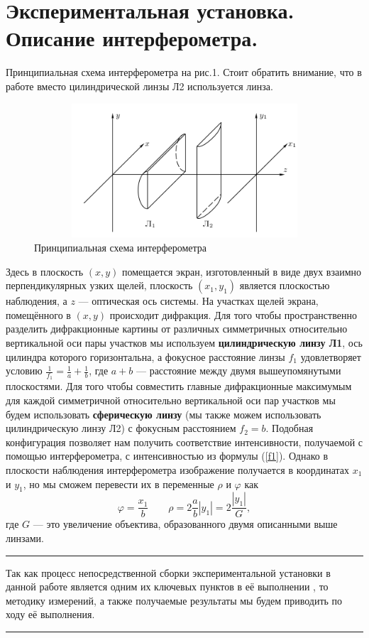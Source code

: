 \documentclass[12pt]{article}
\begin{document}
\section*{Экспериментальная установка. Описание интерферометра.}
\par
	Принципиальная схема интерферометра на рис.1. Стоит обратить внимание, что в работе вместо цилиндрической линзы Л2 используется {} линза.
\begin{figure}[h!]
	\centering
	\includegraphics[width = 12cm, height = 5cm]{image1.png}
	\caption{Принципиальная схема интерферометра}	
\end{figure}	
\par
	Здесь в плоскость $(x,y)$ помещается экран, изготовленный в виде двух взаимно перпендикулярных узких щелей, плоскость $(x_1, y_1)$ является плоскостью наблюдения, а $z$ --- оптическая ось системы. На участках щелей экрана, помещённого в $(x,y)$ происходит дифракция. Для того чтобы пространственно разделить дифракционные картины от различных симметричных относительно вертикальной оси пары участков мы используем {\bf цилиндрическую линзу Л1}, ось цилиндра которого горизонтальна, а фокусное расстояние линзы $f_1$ удовлетворяет условию $\frac{1}{f_1} = \frac{1}{a} + \frac{1}{b}$, где $a + b$ --- расстояние между двумя вышеупомянутыми плоскостями. Для того чтобы совместить главные дифракционные максимумым для каждой симметричной относительно вертикальной оси пар участков мы будем использовать {\bf сферическую линзу} (мы также можем использовать цилиндрическую линзу Л2) с фокусным расстоянием $f_2 = b$. Подобная конфигурация позволяет нам получить соответствие интенсивности, получаемой с помощью интерферометра, с интенсивностью из формулы (\ref{f1}). Однако в плоскости наблюдения интерферометра изображение получается в координатах $x_1$ и $y_1$, но мы сможем перевести их в переменные $\rho$ и $\varphi$ как
\begin{equation}
	\varphi = \frac{x_1}{b} \qquad \rho = 2 \frac{a}{b}|y_1| = 2 \frac{|y_1|}{G},
\end{equation}
где $G$ --- это увеличение объектива, образованного двумя описанными выше линзами.
\noindent\rule{\textwidth}{1pt}
\par
	Так как процесс непосредственной сборки экспериментальной установки в данной работе является одним их ключевых пунктов в её выполнении , то методику измерений, а также получаемые результаты мы будем приводить по ходу её выполнения.
\noindent\rule{\textwidth}{1pt}
\end{document}
